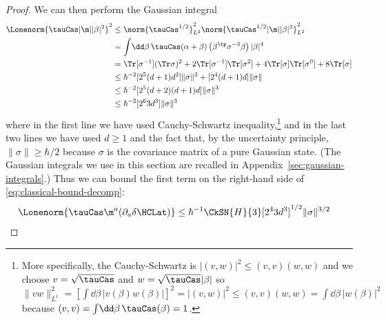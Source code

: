 \documentclass{article}
\numberwithin{equation}{section}
\begin{document}
\begin{proof}
We can then perform the Gaussian integral
\begin{align}\label{eq:gaussian-int-m1-b2}
	\Lonenorm{\tauCas |\m| |\beta|^2 }^2
	&\le  \norm{\tauCas^{1/2}}_{L^2}^2 \norm{\tauCas^{1/2} |\m| |\beta|^2 }_{L^2}^2\\
	&= \int \!\dd \beta\, \tauCas(\alpha+\beta)  \left(\beta^\tp \sigma^{-2} \beta\right) |\beta|^4\\
	&=  \Tr[\sigma^{-1}](\Tr\sigma)^2 + 2\Tr[\sigma^{-1}] \Tr[\sigma^2]+4\Tr[\sigma]\Tr[\sigma^0]+8\Tr[\sigma] \\
	&\le  \hbar^{-2}[2^5(d+1)d^2]\|\sigma\|^3+[2^4(d+1)d]\|\sigma\|\\
	&\le  \hbar^{-2}[2^5(d+2)(d+1)d]\|\sigma\|^3\\
        &\le  \hbar^{-2}[2^6 3 d^3]\|\sigma\|^3
\end{align}
where in the first line we have used Cauchy-Schwartz inequality,\footnote{\label{fn:c-s-integral}More specifically, the Cauchy-Schwartz is $|(v,w)|^2\le (v,v)(w,w)$ and we choose  $v=\sqrt{\tauCas}$ and $w=\sqrt{\tauCas}|\beta|$ so $\|v w\|^2_{L^1} = [\int \!\dd \beta\, |v(\beta)w(\beta)|]^2 = |(v,w)|^2 \le (v,v)(w,w) = \int \!\dd \beta\, |w(\beta)|^2$ because $(v,v) = \int \!\dd \beta\, \tauCas(\beta) = 1$.}  
and in the last two lines 
we have used $d\ge 1$ and the fact that, by the uncertainty principle, $\|\sigma\| \ge \hbar/2$  because $\sigma$ is the covariance matrix of a pure Gaussian state.
(The Gaussian integrals we use in this section are recalled in Appendix~\ref{sec:gaussian-integrals}.)
Thus we can bound the first term on the right-hand side of \eqref{eq:classical-bound-decomp}:
\begin{align} \label{eq:harm-error-classical-Ham}
	\Lonenorm{ \tauCas \m^a(\partial_a \delta \HCLat)}
        &\le \hbar^{-1} \CkSN{H}{3} [2^4 3 d^3]^{1/2}\|\sigma\|^{3/2}
\end{align}




\end{proof}
\end{document}
